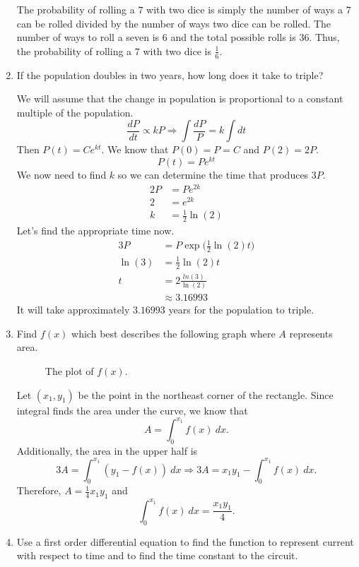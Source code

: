 \begin{enumerate}
  The probability of rolling a \(7\) with two dice is simply the number of
  ways a \(7\) can be rolled divided by the number of ways two dice can be
  rolled.
  The number of ways to roll a seven is \(6\) and the total possible rolls is
  \(36\).
  Thus, the probability of rolling a \(7\) with two dice is \(\frac{1}{6}\).
\item
  If the population doubles in two years, how long does it take to triple?
  \par\smallskip
  We will assume that the change in population is proportional to a constant
  multiple of the population.
  \[
  \frac{dP}{dt} \propto kP\Rightarrow \int\frac{dP}{P} = k\int dt
  \]
  Then \(P(t) = Ce^{kt}\).
  We know that \(P(0) = P = C\) and \(P(2) = 2P\).
  \[
  P(t) = Pe^{kt}
  \]
  We now need to find \(k\) so we can determine the time that produces \(3P\).
  \begin{align*}
    2P &= Pe^{2k}\\
    2  &= e^{2k}\\
    k  &= \frac{1}{2}\ln(2)
  \end{align*}
  Let's find the appropriate time now.
  \begin{align*}
    3P      &= P\exp\Big(\frac{1}{2}\ln(2)t\Big)\\
    \ln(3)  &= \frac{1}{2}\ln(2)t\\
    t       &= 2\frac{ln(3)}{\ln(2)}\\
            &\approx 3.16993
  \end{align*}
  It will take approximately \(3.16993\) years for the population to triple.
\item
  Find \(f(x)\) which best describes the following graph where \(A\) represents
  area.
  \begin{figure}[H]
    \centering
    
    \caption{The plot of \(f(x)\).}
  \end{figure}
  Let \((x_1, y_1)\) be the point in the northeast corner of the rectangle.
  Since integral finds the area under the curve, we know that
  \[
  A = \int_0^{x_1}f(x) \ dx.
  \]
  Additionally, the area in the upper half is
  \[
  3A = \int_0^{x_1}(y_1 - f(x)) \ dx\Rightarrow 3A =
  x_1y_1 - \int_0^{x_1}f(x) \ dx.
  \]
  Therefore, \(A = \frac{1}{4}x_1y_1\) and
  \[
  \int_0^{x_1}f(x) \ dx = \frac{x_1y_1}{4}.
  \]
\item
  Use a first order differential equation to find the function to represent
  current with respect to time and to find the time constant to the circuit.

\end{enumerate}
